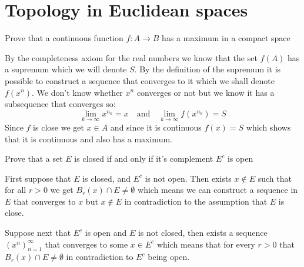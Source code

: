 \documentclass[11pt,a4paper]{article}
\begin{document}
\maketitle

\newpage
\tableofcontents
\newpage

\section{Topology in Euclidean spaces}
\begin{exercise}
  Prove that a continuous function $f\colon A\to B$ has 
  a maximum in a compact space
\end{exercise}
\begin{solution}
  By the completeness axiom for the real numbers we know that the set
  $f(A)$ has a supremum which we will denote $S$. By the definition
  of the supremum it is possible to construct a sequence that converges
  to it which we shall denote $f(x^n)$. We don't know whether $x^n$
  converges or not but we know it has a subsequence that converges so:
  \[
    \lim_{k\to\infty}{x^{n_k}} = x \quad \text{and} \quad 
    \lim_{k\to\infty}{f(x^{n_k})} = S
  \]
  Since $f$ is close we get $x\in A$ and since it is continuous $f(x) = S$
  which shows that it is continuous and also has a maximum.
\end{solution}

\begin{exercise}
  Prove that a set $E$ is closed if and only if it's complement
  $E^c$ is open
\end{exercise}
\begin{solution}
  First suppose that $E$ is closed, and $E^c$ is not open. Then exists
  $x\notin E$ such that for all $r > 0$ we get $B_r(x) \cap E \neq 
  \emptyset$ which means we can construct a sequence in $E$ that converges
  to $x$ but $x\notin E$ in contradiction to the assumption that $E$ is 
  close.

  Suppose next that $E^c$ is open and $E$ is not closed, then exists a sequence
  $(x^n)_{n=1}^{\infty}$ that converges to some $x \in E^c$ which means
  that for every $r > 0$ that $B_r(x) \cap E \neq \emptyset$ in 
  contradiction to $E^c$ being open.
\end{solution}
\end{document}
